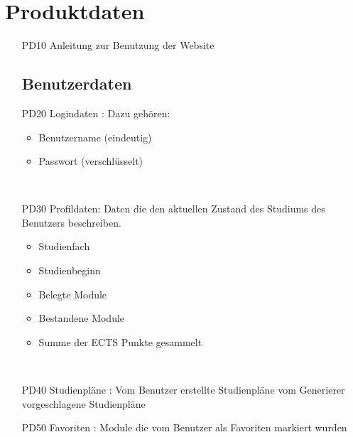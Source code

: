 \section{Produktdaten}
	\begin{itemize}[nosep]
	\addtolength{\itemindent}{5mm}
	\subsection{Systemdaten}
	\item[PD10]Anleitung zur Benutzung der 		Website
	\subsection{Benutzerdaten}
	\item[PD20]Logindaten : Dazu gehören:
		\begin{itemize}
		\item Benutzername (eindeutig)
		\item Passwort (verschlüsselt)
		\end{itemize}\\
	\item[PD30]Profildaten: Daten die den aktuellen Zustand des Studiums des Benutzers beschreiben.
		\begin{itemize}
		\item Studienfach
		\item Studienbeginn
		\item Belegte Module
		\item Bestandene Module 
		\item Summe der ECTS Punkte gesammelt
		\end{itemize}\\
\item[PD40]Studienpläne : 
	Vom Benutzer erstellte Studienpläne 
	vom Generierer vorgeschlagene Studienpläne 
\item[PD50] Favoriten : Module die vom Benutzer als Favoriten markiert wurden
\end{itemize}